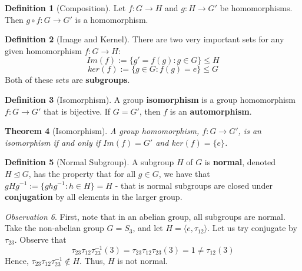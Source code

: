 \documentclass[12pt]{article}
\newtheorem{thm}{Theorem}[section]
\theoremstyle{definition}
\newtheorem{defn}[thm]{Definition}
\theoremstyle{remark}
\newtheorem{obs}[thm]{Observation}
\numberwithin{equation}{section}
\newcommand\B[1]{\textbf{ #1}}
\newcommand\nsub{\trianglelefteq}
\begin{document}
\vspace{15pt}


\begin{defn}[Composition]
        Let $f: G\rightarrow H$ and $g: H\rightarrow G'$ be homomorphisms. Then $g \circ f: G \rightarrow G'$ is a homomorphism.
\end{defn}


\vspace{15pt}


\begin{defn}[Image and Kernel]
        There are two very important sets for any given homomorphism $f: G\rightarrow H$:
        \begin{equation}
                Im(f) := \{g' = f(g) : g \in G\} \leq H
        \end{equation}
        \begin{equation}
                ker(f) := \{g \in G: f(g) = e\} \leq G
        \end{equation}
        Both of these sets are \B{subgroups}.
\end{defn}

\vspace{15pt}


\begin{defn}[Isomorphism]
        A group \B{isomorphism} is a group homomorphism $f:G\rightarrow G'$ that is bijective. If $G = G'$, then $f$ is an \B{automorphism}.
\end{defn}


\vspace{15pt}

\begin{thm}[Isomorphism]
        A group homomorphism, $f:G \rightarrow G'$, is an isomorphism if and only if $Im(f) = G'$ and $ker(f) = \{e\}$.
\end{thm}

\vspace{15pt}

\begin{defn}[Normal Subgroup]
        A subgroup $H$ of $G$ is \B{normal}, denoted $H \nsub G$, has the property that for all $g \in G$, we have that $gHg^{-1} := \{ghg^{-1}: h \in H\} = H$ - that is normal subgroups are closed under \B{conjugation} by all elements in the larger group.
\end{defn}

\begin{obs}
        First, note that in an abelian group, all subgroups are normal. Take the non-abelian group $G = S_3$, and let $H = \langle e, \tau_{12} \rangle$. Let us try conjugate by $\tau_{23}$. Observe that $$\tau_{23}\tau_{12}\tau_{23}^{-1}(3) = \tau_{23}\tau_{12}\tau_{23}(3) = 1 \neq \tau_{12}(3)$$ Hence, $\tau_{23}\tau_{12}\tau_{23}^{-1} \notin H$. Thus, $H$ is not normal.
\end{obs}
\end{document}
